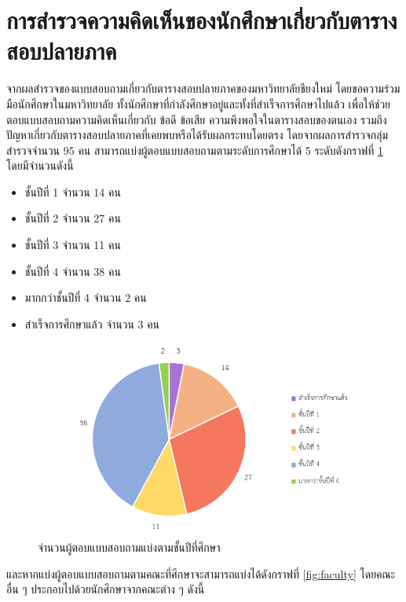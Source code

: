 \section{การสำรวจความคิดเห็นของนักศึกษาเกี่ยวกับตารางสอบปลายภาค}
จากผลสำรวจของแบบสอบถามเกี่ยวกับตารางสอบปลายภาคของมหาวิทยาลัยชียงใหม่ โดยขอความร่วมมือนักศึกษาในมหาวิทยาลัย
ทั้งนักศึกษาที่กำลังศึกษาอยู่และทั้งที่สำเร็จการศึกษาไปแล้ว เพื่อให้ช่วยตอบแบบสอบถามความคิดเห็นเกี่ยวกับ ข้อดี ข้อเสีย ความพึงพอใจในตารางสอบของตนเอง
รวมถึงปัญหาเกี่ยวกับตารางสอบปลายภาคที่เคยพบหรือได้รับผลกระทบโดยตรง โดยจากผลการสำรวจกลุ่มสำรวจจำนวน 95 คน สามารถแบ่งผู้ตอบแบบสอบถามตามระดับการศึกษาได้ 5 ระดับดังกราฟที่ \ref{fig:academic_year} โดยมีจำนวนดังนี้
\begin{itemize}
  \item ชั้นปีที่ 1 จำนวน 14 คน
  \item ชั้นปีที่ 2 จำนวน 27 คน
  \item ชั้นปีที่ 3 จำนวน 11 คน
  \item ชั้นปีที่ 4 จำนวน 38 คน
  \item มากกว่าชั้นปีที่ 4 จำนวน 2 คน
  \item สำเร็จการศึกษาแล้ว จำนวน 3 คน
\end{itemize}
\begin{figure}
  \begin{center}
    \includegraphics[width=\linewidth]{images/group_by_academic_year.png}
  \end{center}
  \caption[Poem]{จำนวนผู้ตอบแบบสอบถามแบ่งตามชั้นปีที่ศึกษา}
  \label{fig:academic_year}     
\end{figure}
และหากแบ่งผู้ตอบแบบสอบถามตามคณะที่ศึกษาจะสามารถแบ่งได้ดังกราฟที่ \ref{fig:faculty} 
โดยคณะอื่น ๆ ประกอบไปด้วยนักศึกษาจากคณะต่าง ๆ ดังนี้
